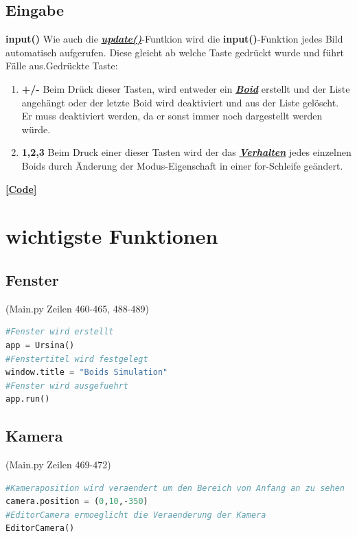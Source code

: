 \documentclass[a4paper, hidelinks, 12pt]{article}
\begin{document}
\subsection{Eingabe}
\textbf{input()}\label{Umsetzunginput}
Wie auch die \hyperref[Umsetzungupdate]{\textbf{\emph{update()}}}-Funtkion\cite{update} wird die \textbf{input()}-Funktion jedes Bild automatisch aufgerufen. Diese gleicht ab welche Taste gedrückt wurde und führt Fälle aus\cite{input}.\newline Gedrückte Taste: 

\begin{enumerate}
\item \textbf{+/-} Beim Drück dieser Tasten, wird entweder ein \hyperref[UmsetzungBoid]{\textbf{\emph{Boid}}} erstellt und der Liste angehängt oder der letzte Boid wird deaktiviert und aus der Liste gelöscht. Er muss deaktiviert werden, da er sonst immer noch dargestellt werden würde.
\item \textbf{1,2,3} Beim Druck einer dieser Tasten wird der das \hyperref[IdeeVerhalten]{\textbf{\emph{Verhalten}}} jedes einzelnen Boids durch Änderung der Modus-Eigenschaft in einer for-Schleife geändert.
	
\end{enumerate}
\hyperref[Codeinput]{\textbf{[Code]}}


\newpage
\section{wichtigste Funktionen}

\subsection{Fenster}(Main.py Zeilen 460-465, 488-489)\label{CodeFenster}
\begin{lstlisting}[style=mystyle, language=Python]
#Fenster wird erstellt
app = Ursina()
#Fenstertitel wird festgelegt
window.title = "Boids Simulation"
#Fenster wird ausgefuehrt
app.run()
\end{lstlisting}
\subsection{Kamera}(Main.py Zeilen 469-472)\label{Kamera}
\begin{lstlisting}[style=mystyle, language=Python]
#Kameraposition wird veraendert um den Bereich von Anfang an zu sehen
camera.position = (0,10,-350)
#EditorCamera ermoeglicht die Veraenderung der Kamera
EditorCamera()
\end{lstlisting}
\end{document}
